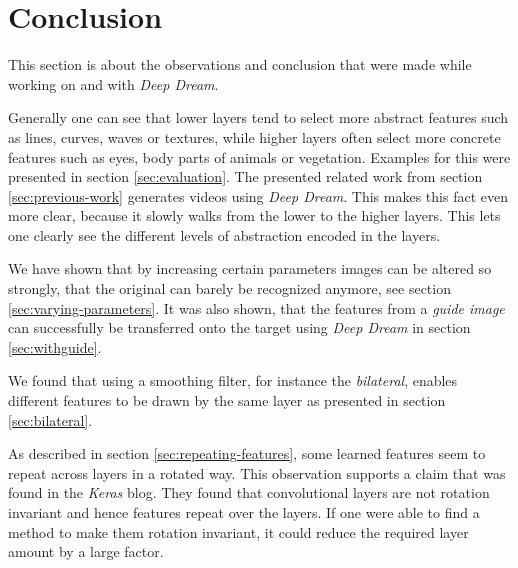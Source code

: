\section{Conclusion}
\label{sec:conclusion}
This section is about the observations and conclusion that were made while working on and with \textit{Deep Dream}.

Generally one can see that lower layers tend to select more abstract features such as lines, curves, waves or textures, while higher layers often select more concrete features such as eyes, body parts of animals or vegetation.
Examples for this were presented in section \ref{sec:evaluation}.
The presented related work from section \ref{sec:previous-work} generates videos using \textit{Deep Dream}.
This makes this fact even more clear, because it slowly walks from the lower to the higher layers.
This lets one clearly see the different levels of abstraction encoded in the layers.

We have shown that by increasing certain parameters images can be altered so strongly, that the original can barely be recognized anymore, see section \ref{sec:varying-parameters}.
It was also shown, that the features from a \emph{guide image} can successfully be transferred onto the target using \textit{Deep Dream} in section \ref{sec:withguide}.

We found that using a smoothing filter, for instance the \textit{bilateral}, enables different features to be drawn by the same layer as presented in section \ref{sec:bilateral}.

As described in section \ref{sec:repeating-features}, some learned features seem to repeat across layers in a rotated way.
This observation supports a claim that was found in the \textit{Keras} blog.\cite{keras-blog}
They found that convolutional layers are not rotation invariant and hence features repeat over the layers.
If one were able to find a method to make them rotation invariant, it could reduce the required layer amount by a large factor.

